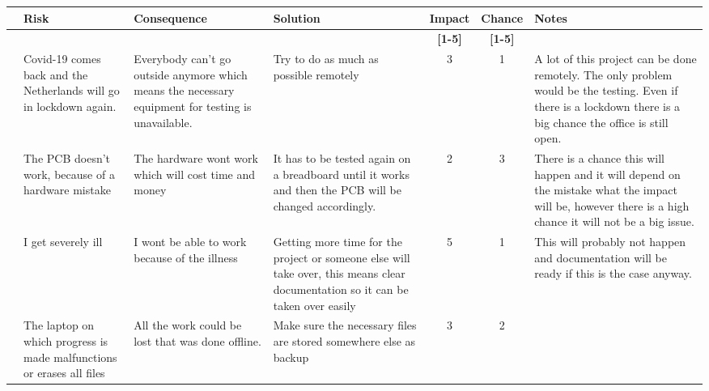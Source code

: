 \begin{longtable}{| c | p{3cm} | p{3cm} | p{4cm} | c | c | p{3cm} |}
    \hline
    \rowcolor{teal} & \textbf{Risk} & \textbf{Consequence} & \textbf{Solution} & \textbf{Impact} & \textbf{Chance} & \cellcolor{lightgray}\textbf{Notes} \\\hline
    \rowcolor{teal}& & & & \textbf{[1-5]} & \textbf{[1-5]} &\cellcolor{lightgray} \\\hline
    \rowcolor{cyan}\theriskTableCounter{} &
    \stepcounter{riskTableCounter}
    Covid-19 comes back and the Netherlands will go in lockdown again.& Everybody can't go outside anymore which means the necessary equipment for testing is unavailable. & 
    Try to do as much as possible remotely &
    \cellcolor{yellow}3 &
    \cellcolor{green}1 &
    \cellcolor{lightgray}A lot of this project can be done remotely. The only problem would be the testing. Even if there is a lockdown there is a big chance the office is still open. 
    \\ \hline
    \rowcolor{teal}\theriskTableCounter{} &
    \stepcounter{riskTableCounter}
    The PCB doesn't work, because of a hardware mistake&
    The hardware wont work which will cost time and money&
    It has to be tested again on a breadboard until it works and then the PCB will be changed accordingly. &
    \cellcolor{lime}2&
    \cellcolor{yellow}3&
    \cellcolor{lightgray}There is a chance this will happen and it will depend on the mistake what the impact will be, however there is a high chance it will not be a big issue.
    \\\hline
    \rowcolor{cyan}\theriskTableCounter{} &
    \stepcounter{riskTableCounter}
    I get severely ill & 
    I wont be able to work because of the illness &
    Getting more time for the project or someone else will take over, this means clear documentation so it can be taken over easily &
    \cellcolor{red}5 &
    \cellcolor{green}1 &
    \cellcolor{lightgray}This will probably not happen and documentation will be ready if this is the case anyway.
    \\ \hline
    \rowcolor{teal}\theriskTableCounter{} &
    \stepcounter{riskTableCounter}
    The laptop on which progress is made malfunctions or erases all files&
    All the work could be lost that was done offline. &
    Make sure the necessary files are stored somewhere else as backup& 
    \cellcolor{yellow}3&
    \cellcolor{lime}2&

\end{longtable}
